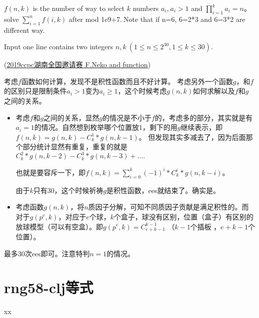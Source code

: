 \vbox{}




\begin{example}
	$f(n,k)$ is the number of way to select $k$ numbers $a_i$,$\ a_i>1$ and $\prod_{i=1}^{k} a_{i} = n$。
	solve $\sum_{i = 1} ^ {n} f(i,k)$ after mod 1e9+7.$\ $Note that if n=6, 6=2*3 and 6=3*2 are different way.
	
	Input one line contains two integers $n,k\ (1\le n\le 2^{30},1\le k\le 30)$.
	
	(\href{http://acm.hdu.edu.cn/showproblem.php?pid=6537}{2019ccpc湖南全国邀请赛 F.Neko and function})
\end{example}

\begin{solution}
	考虑$f$函数如何计算，发现不是积性函数而且不好计算。
	考虑另外一个函数$g$，和$f$的区别只是限制条件$a_i>1$变为$a_i\ge 1$，这个时候考虑$g(n,k)$如何求解以及$f$和$g$之间的关系。
	\begin{itemize}
		\item 考虑$f$和$g$之间的关系，显然$g$的情况是不小于$f$的，考虑多的部分，其实就是有$a_i=1$的情况。自然想到枚举哪个位置放1，剩下的用$g$继续表示，即$f(n,k) = g(n,k) - C_k^1*g(n,k-1)$。 但发现其实多减去了，因为后面那个部分统计显然有重复，重复的就是$C_k^2*g(n,k-2) - C_k^3*g(n,k-3)+....$   
		
		也就是要容斥一下，即$f(n,k) = \sum_{i=0}^k(-1)^i*C_k^i*g(n,k-i)$。  
		
		由于$k$只有30，这个时候祈祷$g$是积性函数，ees就结束了。确实是。
		\item 考虑函数$g(n,k)$，将$n$质因子分解，可知{\heiti 不同质因子贡献是满足积性的}。而对于$g(p^e,k)$，对应于$e$个球，$k$个盒子，球没有区别，位置（盒子）有区别的放球模型（可以有空盒）。即$g(p^e,k) = C_{e+k-1}^{k-1}$  （$k-1$个插板 ，$e+k-1$个位置）。
	\end{itemize}
	
	最多30次ees即可。注意特判$n=1$的情况。
\end{solution}





\section{rng58-clj等式}



\begin{problemset}
	\item xx
\end{problemset}